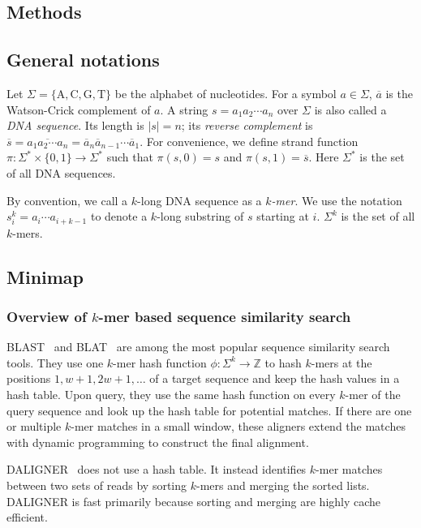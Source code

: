 \documentclass{bioinfo}
\begin{document}
\begin{methods}
\section{Methods}

\subsection{General notations}

Let $\Sigma=\{\mathrm{A},\mathrm{C},\mathrm{G},\mathrm{T}\}$ be the
alphabet of nucleotides. For a symbol $a\in\Sigma$, $\overline{a}$ is the
Watson-Crick complement of $a$. A string $s=a_1a_2\cdots a_n$ over
$\Sigma$ is also called a \emph{DNA sequence}. Its length is $|s|=n$;
its \emph{reverse complement} is $\overline{s}=\overline{a_1a_2\cdots
a_n}=\overline{a}_n\overline{a}_{n-1}\cdots\overline{a}_1$.
For convenience, we define strand function
$\pi:\Sigma^*\times\{0,1\}\to\Sigma^*$ such that $\pi(s,0)=s$ and
$\pi(s,1)=\overline{s}$. Here $\Sigma^*$ is the set of all DNA sequences.

By convention, we call a $k$-long DNA sequence as a \emph{$k$-mer}. We use the
notation $s^k_i=a_i\cdots a_{i+k-1}$ to denote a $k$-long substring of $s$
starting at $i$. $\Sigma^k$ is the set of all $k$-mers.

\subsection{Minimap}

\subsubsection{Overview of $k$-mer based sequence similarity search}\label{sec:minimapov}

BLAST~\citep{Altschul:1997vn} and BLAT~\citep{Kent:2002jk} are among the most
popular sequence similarity search tools. They use one $k$-mer hash function
$\phi:\Sigma^k\to\mathbb{Z}$ to hash $k$-mers at the positions
$1,w+1,2w+1,\ldots$ of a target sequence and keep the hash values in a hash
table. Upon query, they use the same hash function on every $k$-mer of the
query sequence and look up the hash table for potential matches. If there are
one or multiple $k$-mer matches in a small window, these aligners extend the
matches with dynamic programming to construct the final alignment.

DALIGNER~\citep{DBLP:conf/wabi/Myers14} does not use a hash table. It instead
identifies $k$-mer matches between two sets of reads by sorting $k$-mers and
merging the sorted lists. DALIGNER is fast primarily because sorting and
merging are highly cache efficient.


\end{methods}
\end{document}
